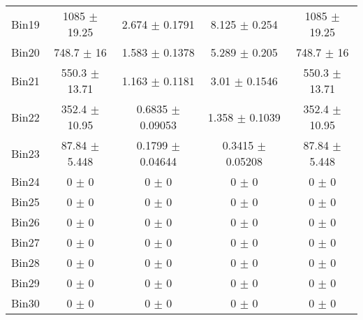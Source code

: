 \begin{tabular}{@{\extracolsep{4pt}}lcccc@{}}
     Bin19 & 1085 $\pm$ 19.25 & 2.674 $\pm$ 0.1791 & 8.125 $\pm$ 0.254 & 1085 $\pm$ 19.25 \\ 
     Bin20 & 748.7 $\pm$ 16 & 1.583 $\pm$ 0.1378 & 5.289 $\pm$ 0.205 & 748.7 $\pm$ 16 \\ 
     Bin21 & 550.3 $\pm$ 13.71 & 1.163 $\pm$ 0.1181 & 3.01 $\pm$ 0.1546 & 550.3 $\pm$ 13.71 \\ 
     Bin22 & 352.4 $\pm$ 10.95 & 0.6835 $\pm$ 0.09053 & 1.358 $\pm$ 0.1039 & 352.4 $\pm$ 10.95 \\ 
     Bin23 & 87.84 $\pm$ 5.448 & 0.1799 $\pm$ 0.04644 & 0.3415 $\pm$ 0.05208 & 87.84 $\pm$ 5.448 \\ 
     Bin24 & 0 $\pm$ 0 & 0 $\pm$ 0 & 0 $\pm$ 0 & 0 $\pm$ 0 \\ 
     Bin25 & 0 $\pm$ 0 & 0 $\pm$ 0 & 0 $\pm$ 0 & 0 $\pm$ 0 \\ 
     Bin26 & 0 $\pm$ 0 & 0 $\pm$ 0 & 0 $\pm$ 0 & 0 $\pm$ 0 \\ 
     Bin27 & 0 $\pm$ 0 & 0 $\pm$ 0 & 0 $\pm$ 0 & 0 $\pm$ 0 \\ 
     Bin28 & 0 $\pm$ 0 & 0 $\pm$ 0 & 0 $\pm$ 0 & 0 $\pm$ 0 \\ 
     Bin29 & 0 $\pm$ 0 & 0 $\pm$ 0 & 0 $\pm$ 0 & 0 $\pm$ 0 \\ 
     Bin30 & 0 $\pm$ 0 & 0 $\pm$ 0 & 0 $\pm$ 0 & 0 $\pm$ 0 \\ 
\hline\hline
  \end{tabular}

